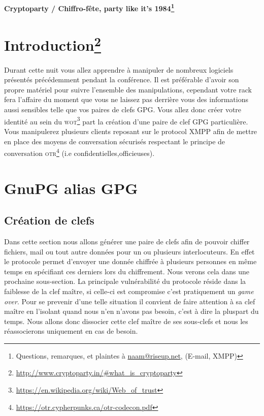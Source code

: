 \documentclass[a4paper]{article}
\begin{document}
\begin{center}
{\Large
    {\bf Cryptoparty / Chiffro-fête, party like it's
            \textsc{1984}\protect\footnote{Questions, remarques, et plaintes à
    \url{naam@riseup.net}, (E-mail, XMPP)}
   }
}
\end{center}

\bigskip

\section*{Introduction\protect\footnote{\url{http://www.cryptoparty.in/\#what\_is\_cryptoparty}}}

Durant cette nuit vous allez apprendre à manipuler de nombreux logiciels
présentés précédemment pendant la conférence. Il est préférable d'avoir son
propre matériel pour suivre l'ensemble des manipulations, cependant votre rack
fera l'affaire du moment que vous ne laissez pas derrière vous des informations
aussi sensibles telle que vos paires de clefs \textsc{GPG}. Vous allez donc créer votre
identité au sein du \textsc{wot\protect\footnote{\url{https://en.wikipedia.org/wiki/Web_of_trust}}}
part la création d'une paire de clef GPG particulière. Vous manipulerez
plusieurs clients reposant sur le protocol XMPP afin de mettre en place des
moyens de conversation sécurisés respectant le principe de conversation
\textsc{otr\protect\footnote{\url{https://otr.cypherpunks.ca/otr-codecon.pdf}}}
(i.e confidentielles,officieuses).

\section{GnuPG alias GPG}

\subsection{Création de clefs}

Dans cette section nous allons générer une paire de clefs afin de pouvoir
chiffer fichiers, mail ou tout autre données pour un ou plusieurs
interlocuteurs. En effet le protocole permet d'envoyer une donnée chiffrée à
plusieurs personnes en même temps en spécifiant ces derniers lors du
chiffrement. Nous verons cela dans une prochaine sous-section.
La principale vulnérabilité du protocole réside dans la faiblesse de la clef
maître, si celle-ci est compromise c'est pratiquement un \emph{game over}.
Pour se prevenir d'une telle situation il convient de faire attention à sa clef
maître en l'isolant quand nous n'en n'avons pas besoin, c'est à dire la pluspart
du temps. Nous allons donc dissocier cette clef maître de ses sous-clefs et
nous les réassocierons uniquement en cas de besoin.
\end{document}
